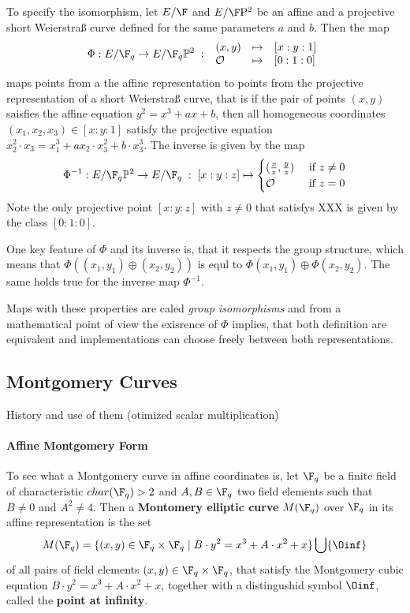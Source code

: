 To specify the isomorphism, let $E/\F$ and $E/\F\mathrm{P}^2$ be an affine and a projective short Weierstraß curve defined for the same parameters $a$ and $b$. Then the map
\begin{equation}
\Phi : E/\F_q \to E/\F_q\mathbb{P}^2\;:\;
\begin{array}{lcl}
(x,y)       &\mapsto & [x:y:1]\\
\mathcal{O} &\mapsto & [0:1:0]
\end{array}
\end{equation}
maps points from a the affine representation to points from the projective representation of a short Weierstraß curve, that is if the pair of points $(x,y)$ saisfies the affine equation $y^2= x^3 + ax + b$, then all homogeneous coordinates $(x_1,x_2,x_3)\in [x:y:1]$ satisfy the projective equation $x_2^2\cdot x_3= x_1^3 + ax_2\cdot x_3^2 + b\cdot x_3^3$. The inverse is given by the map
\begin{equation}
\Phi^{-1} : E/\F_q\mathbb{P}^2\to E/\F_q \;:\; [x:y:z] \mapsto \begin{cases}
(\frac{x}{z},\frac{y}{z}) & \text{ if } z\neq 0\\
\mathcal{O} & \text{ if } z=0
\end{cases}
\end{equation}
Note the only projective point $[x:y:z]$ with $z\neq 0$ that satisfys XXX is given by the class $[0:1:0]$. 

One key feature of $\Phi$ and its inverse is, that it respects the group structure, which means that $\Phi((x_1,y_1)\oplus (x_2,y_2))$ is equl to $\Phi(x_1,y_1)\oplus \Phi(x_2,y_2)$. The same holds true for the inverse map $\Phi^{-1}$.

Maps with these properties are caled \textit{group isomorphisms} and from a mathematical point of view the exisrence of $\Phi$ implies, that both definition are equivalent and implementations can choose freely between both representations. 


\subsection{Montgomery Curves}
History and use of them (otimized scalar multiplication)

\paragraph{Affine Montgomery Form}
To see what a Montgomery curve in affine coordinates is, let $\F_q$ be a finite field of characteristic $char(\F_q)>2$ and $A,B\in \F_q$ two field elements such that $B\neq 0$ and $A^2 \neq 4$. Then a \textbf{Montomery elliptic curve} $M(\F_q)$ over $\F_q$ in its affine representation is the set
\begin{equation}
\label{def_short_weierstrass_curve}
M(\F_q) = \{(x,y)\in \F_q\times \F_q\;|\; B\cdot y^2 = x^3 + A\cdot x^2 + x  \} \bigcup \{\Oinf\}
\end{equation}
of all pairs of field elements $(x,y)\in \F_q\times \F_q$, that satisfy the Montgomery cubic equation $B\cdot y^2 = x^3 + A\cdot x^2 + x$, together with a distingushid symbol $\Oinf$, called the \textbf{point at infinity}.

